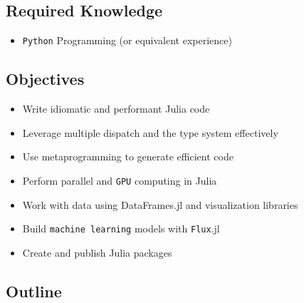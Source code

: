 \documentclass[
]{article}
\providecommand{\tightlist}{%
  \setlength{\itemsep}{0pt}\setlength{\parskip}{0pt}}
\begin{document}
\subsection{Required Knowledge}\label{required-knowledge}

\begin{itemize}
\tightlist
\item
  \texttt{Python} Programming (or equivalent experience)
\end{itemize}

\subsection{Objectives}\label{objectives}

\begin{itemize}
\tightlist
\item
  Write idiomatic and performant Julia code
\item
  Leverage multiple dispatch and the type system effectively
\item
  Use metaprogramming to generate efficient code
\item
  Perform parallel and \texttt{GPU} computing in Julia
\item
  Work with data using DataFrames.jl and visualization libraries
\item
  Build \texttt{machine\ learning} models with \texttt{Flux}.jl
\item
  Create and publish Julia packages
\end{itemize}

\subsection{Outline}\label{outline}
\end{document}
